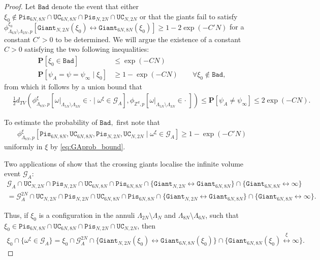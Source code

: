 \documentclass[article,11pt,reqno]{amsart}
\newcommand{\cc}{\leftrightarrow}
\newcommand{\Giant}{\mathtt{Giant}}
\newcommand{\Pis}{\mathtt{Pis}}
\newcommand{\xiA}{\xi_0}
\begin{document}
\begin{proof}
Let $\mathtt{Bad}$ denote the event that either $\xi_0\not\in \mathtt{Pis}_{6N, 8N}\cap \mathtt{UC}_{6N,8N}\cap \mathtt{Pis}_{N,2N}\cap \mathtt{UC}_{N,2N}$ or that the giants fail to satisfy $\phi_{\Lambda_{6N}\setminus \Lambda_{2N},p}^{\xiA}[\mathtt{Giant}_{N,2N}(\xiA) \cc \mathtt{Giant}_{6N,8N}(\xiA)]\geq 1-2\exp(-C'N)$ for a constant $C'>0$ to be determined. We will argue the existence of a constant $C>0$ satisfying the two following inequalities:
\begin{align}
\boldsymbol{P}[\xi_0\in \mathtt{Bad}] &\leq \exp(-CN) \label{eq:Bad_is_Unlikely}\\
\boldsymbol{P}[\psi_A=\psi=\psi_{\infty}\mid \xi_0] &\geq 1-\exp(-CN) \qquad \forall \xi_0\not\in\mathtt{Bad}, \label{eq:Not_Bad_is_Good}
\end{align}
from which it follows by a union bound that
\begin{align}
&\frac{1}{2}d_{TV}(\phi^{\xi}_{\Lambda_{8N},p}[ \omega|_{\Lambda_{5N}\setminus \Lambda_{3N}}\in \cdot\mid \omega ^{\xi}\in \mathcal{G}_A], \phi_{\mathbb{Z}^d,p}[\omega|_{\Lambda_{5N}\setminus \Lambda_{3N}} \in \cdot \;])
\leq  \boldsymbol{P}[\psi_A\neq\psi_{\infty}]\leq 2\exp(-CN).\label{eq:annulus_marginals_close_to_unconditioned}  
\end{align}

To estimate the probability of $\mathtt{Bad},$ first note that
\begin{align}\label{eq:high_probability_events_proof}
\phi^{\xi}_{\Lambda_{8N},p}[\mathtt{Pis}_{6N, 8N}, \mathtt{UC}_{6N,8N}, \mathtt{Pis}_{N,2N},\mathtt{UC}_{N,2N}\mid \omega^{\xi}\in\mathcal{G}_A]\geq 1- \exp(-C'N)
\end{align}
uniformly in $\xi$ by \eqref{eq:GAprob_bound}.



Two applications of  show that the crossing giants localise the infinite volume event $\mathcal{G}_A$: 
\begin{align*}
    \mathcal{G}_A \cap \mathtt{UC}_{N,2N} \cap \Pis_{N,2N} \cap \mathtt{UC}_{6N,8N}\cap \Pis_{6N,8N} \cap \{\Giant_{N,2N} \cc \Giant_{6N,8N}\} \cap \{\Giant_{6N,8N} \cc \infty \}\\
    =   \mathcal{G}^{2N}_A \cap \mathtt{UC}_{N,2N} \cap \Pis_{N,2N} \cap \mathtt{UC}_{6N,8N}\cap \Pis_{6N,8N} \cap \{\Giant_{N,2N} \cc \Giant_{6N,8N}\} \cap \{\Giant_{6N,8N}\cc \infty \}.
\end{align*}

Thus, if $\xiA$ is a configuration in the annuli $\Lambda_{2N}\setminus \Lambda_{N}$ and $\Lambda_{8N}\setminus \Lambda_{6N}$, such that $\xiA\in\mathtt{Pis}_{6N, 8N}\cap \mathtt{UC}_{6N,8N}\cap \mathtt{Pis}_{N,2N} \cap\mathtt{UC}_{N,2N}$, then 
\begin{align*}
\xiA \cap \{ \omega^\xi \in \mathcal{G}_A\} =   \xiA \cap \mathcal{G}_A^{2N} \cap \{\mathtt{Giant}_{N,2N}(\xiA)\cc \mathtt{Giant}_{6N,8N}(\xiA) \} \cap \{\Giant_{6N,8N}(\xiA) \overset{\xi}{\cc} \infty \}.
\end{align*}



\end{proof}
\end{document}
